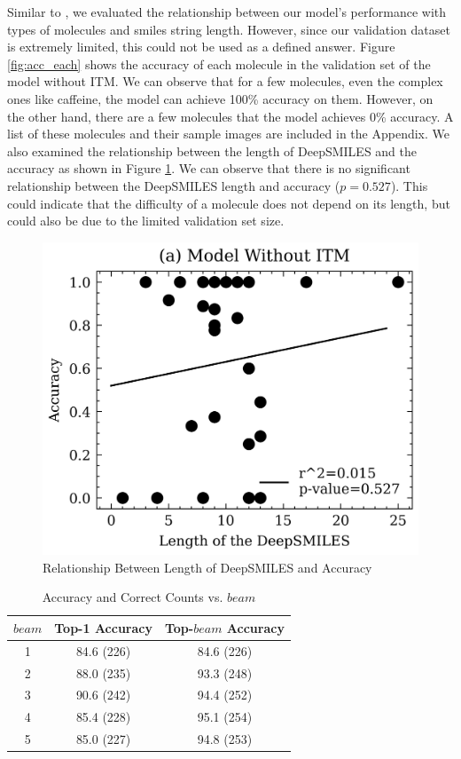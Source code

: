 \documentclass[12pt]{article}
\begin{document}
Similar to \cite{swinocsr}, we evaluated the relationship between our model's performance with types of molecules and smiles string length. However, since our validation dataset is extremely limited, this could not be used as a defined answer. Figure \ref{fig:acc_each} shows the accuracy of each molecule in the validation set of the model without ITM. We can observe that for a few molecules, even the complex ones like caffeine, the model can achieve 100\% accuracy on them. However, on the other hand, there are a few molecules that the model achieves 0\% accuracy. A list of these molecules and their sample images are included in the Appendix. We also examined the relationship between the length of DeepSMILES and the accuracy as shown in Figure \ref{lenacc}. We can observe that there is no significant relationship between the DeepSMILES length and accuracy ($p=0.527$). This could indicate that the difficulty of a molecule does not depend on its length, but could also be due to the limited validation set size.  

\begin{figure}
    \centering
    \includegraphics[width=0.5\linewidth]{lenacc.png}
    \caption{Relationship Between Length of DeepSMILES and Accuracy}
    \label{lenacc}
\end{figure}



\begin{table}[]
    \centering
    \begin{tabular}{c|cc}
      $beam$ & Top-1 Accuracy & Top-$beam$ Accuracy\\ \hline
1 & 84.6 (226) & 84.6 (226) \\ 2 & 88.0 (235) & 93.3 (248) \\ 3 & 90.6 (242) & 94.4 (252) \\ 4 & 85.4 (228) & 95.1 (254) \\ 5 & 85.0 (227) & 94.8 (253) \\
    \end{tabular}
    \caption{Accuracy and Correct Counts vs. $beam$}
    \label{tab:beam}
\end{table}
\end{document}
